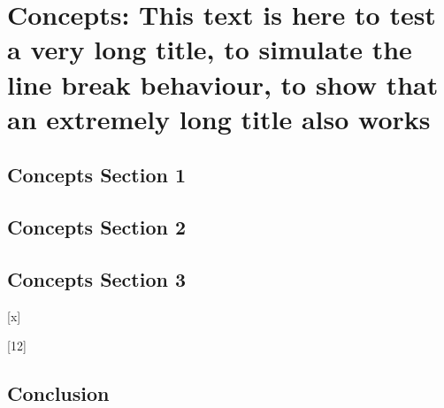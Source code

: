 %
\chapter[Concepts]{Concepts: This text is here to test a very long title, to simulate the line break behaviour, to show that an extremely long title also works}
\label{sec:concepts}



\Blindtext[2][1]

\section{Concepts Section 1}
\label{sec:concepts:sec1}

\Blindtext[2][2]

\section{Concepts Section 2}
\label{sec:concepts:sec2}

\blindmathtrue
\blindtext
 
\blindmathfalse
\blindtext


\section{Concepts Section 3}
\label{sec:concepts:sec3}

 
[x]

[12]
	
\blinditemize
\blindenumerate
\blinddescription



\section{Conclusion}
\label{sec:concepts:conclusion}


